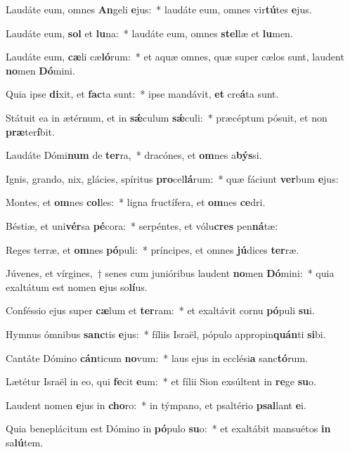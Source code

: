 \item Laudáte eum, omnes \textbf{An}geli \textbf{e}jus:~* laudáte eum, omnes vir\textbf{tú}tes \textbf{e}jus.
\item Laudáte eum, \textbf{sol} et \textbf{lu}na:~* laudáte eum, omnes \textbf{stel}læ et \textbf{lu}men.
\item Laudáte eum, \textbf{cæ}li cæ\textbf{ló}rum:~* et aquæ omnes, quæ super cælos sunt, laudent \textbf{no}men \textbf{Dó}mini.
\item Quia ipse \textbf{di}xit, et \textbf{fac}ta sunt:~* ipse mandávit, \textbf{et} cre\textbf{á}ta sunt.
\item Státuit ea in ætérnum, et in \textbf{sǽ}culum \textbf{sǽ}culi:~* præcéptum pósuit, et non \textbf{præ}ter\textbf{í}bit.
\item Laudáte Dómi\textbf{num} de \textbf{ter}ra,~* dracónes, et \textbf{om}nes a\textbf{býs}si.
\item Ignis, grando, nix, glácies, spíritus \textbf{pro}cel\textbf{lá}rum:~* quæ fáciunt \textbf{ver}bum \textbf{e}jus:
\item Montes, et \textbf{om}nes \textbf{col}les:~* ligna fructífera, et \textbf{om}nes \textbf{ce}dri.
\item Béstiæ, et uni\textbf{vér}sa \textbf{pé}cora:~* serpéntes, et vólu\textbf{cres} pen\textbf{ná}tæ:
\item Reges terræ, et \textbf{om}nes \textbf{pó}puli:~* príncipes, et omnes \textbf{jú}dices \textbf{ter}ræ.
\item Júvenes, et vírgines,~† senes cum junióribus laudent \textbf{no}men \textbf{Dó}mini:~* quia exaltátum est nomen \textbf{e}jus so\textbf{lí}us.
\item Conféssio ejus super \textbf{cæ}lum et \textbf{ter}ram:~* et exaltávit cornu \textbf{pó}puli \textbf{su}i.
\item Hymnus ómnibus \textbf{sanc}tis \textbf{e}jus:~* fíliis Israël, pópulo appropin\textbf{quán}ti \textbf{si}bi.
\item Cantáte Dómino \textbf{cán}ticum \textbf{no}vum:~* laus ejus in ecclési\textbf{a} sanc\textbf{tó}rum.
\item Lætétur Israël in eo, qui \textbf{fe}cit \textbf{e}um:~* et fílii Sion exsúltent in \textbf{re}ge \textbf{su}o.
\item Laudent nomen \textbf{e}jus in \textbf{cho}ro:~* in týmpano, et psaltério \textbf{psal}lant \textbf{e}i.
\item Quia beneplácitum est Dómino in \textbf{pó}pulo \textbf{su}o:~* et exaltábit mansuétos \textbf{in} sa\textbf{lú}tem.
